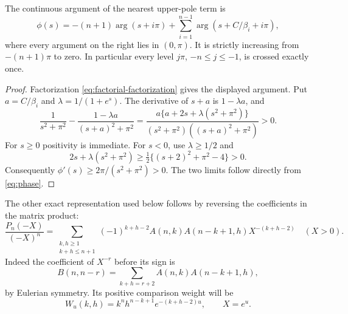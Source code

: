 \begin{lemma}\label{lem:phase}
The continuous argument of the nearest upper-pole term is
\begin{equation}\label{eq:phase}
\phi(s)=-(n+1)\arg(s+i\pi)
 +\sum_{i=1}^{n-1}\arg(s+C/\beta_i+i\pi),
\end{equation}
where every argument on the right lies in $(0,\pi)$. It is strictly increasing from $-(n+1)\pi$ to zero. In particular every level $j\pi$, $-n\le j\le-1$, is crossed exactly once.
\end{lemma}
\begin{proof}
Factorization \eqref{eq:factorial-factorization} gives the displayed argument. Put $a=C/\beta_i$ and $\lambda=1/(1+e^s)$. The derivative of $s+a$ is $1-\lambda a$, and
\[
\frac1{s^2+\pi^2}-\frac{1-\lambda a}{(s+a)^2+\pi^2}
=\frac{a\{a+2s+\lambda(s^2+\pi^2)\}}
 {(s^2+\pi^2)((s+a)^2+\pi^2)}>0.
\]
For $s\ge0$ positivity is immediate. For $s<0$, use $\lambda\ge1/2$ and
\[
2s+\lambda(s^2+\pi^2)\ge\tfrac12\{(s+2)^2+\pi^2-4\}>0.
\]
Consequently $\phi'(s)\ge2\pi/(s^2+\pi^2)>0$. The two limits follow directly from \eqref{eq:phase}.
\end{proof}

The other exact representation used below follows by reversing the coefficients in the matrix product:
\begin{equation}\label{eq:double-sum}
\frac{P_n(-X)}{(-X)^n}
=\sum_{\substack{k,h\ge1\\k+h\le n+1}}
 (-1)^{k+h-2}A(n,k)A(n-k+1,h)X^{-(k+h-2)}\quad(X>0).
\end{equation}
Indeed the coefficient of $X^{-r}$ before its sign is
\[
B(n,n-r)=\sum_{k+h=r+2}A(n,k)A(n-k+1,h),
\]
by Eulerian symmetry. Its positive comparison weight will be
\begin{equation}\label{eq:ideal-weight}
W_u(k,h)=k^n h^{n-k+1}e^{-(k+h-2)u},\qquad X=e^u.
\end{equation}
